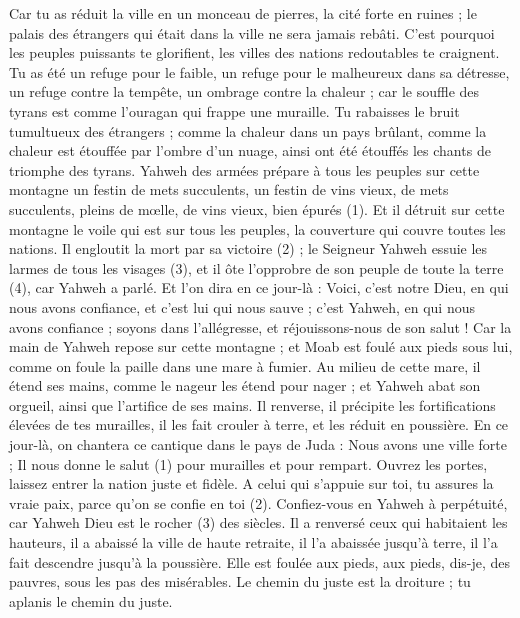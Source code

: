 \begin{multicols}{2}
Car tu as réduit la ville en un monceau de pierres, la cité forte en ruines ; le palais des étrangers qui était dans la ville ne sera jamais rebâti.
C’est pourquoi les peuples puissants te glorifient, les villes des nations redoutables te craignent.
Tu as été un refuge pour le faible, un refuge pour le malheureux dans sa détresse, un refuge contre la tempête, un ombrage contre la chaleur ; car le souffle des tyrans est comme l’ouragan qui frappe une muraille.
Tu rabaisses le bruit tumultueux des étrangers ; comme la chaleur dans un pays brûlant, comme la chaleur est étouffée par l'ombre d’un nuage, ainsi ont été étouffés les chants de triomphe des tyrans.
Yahweh des armées prépare à tous les peuples sur cette montagne un festin de mets succulents, un festin de vins vieux, de mets succulents, pleins de mœlle, de vins vieux, bien épurés (1).
Et il détruit sur cette montagne le voile qui est sur tous les peuples, la couverture qui couvre toutes les nations.
Il engloutit la mort par sa victoire (2) ; le Seigneur Yahweh essuie les larmes de tous les visages (3), et il ôte l'opprobre de son peuple de toute la terre (4), car Yahweh a parlé.
Et l'on dira en ce jour-là : Voici, c'est notre Dieu, en qui nous avons confiance, et c’est lui qui nous sauve ; c'est Yahweh, en qui nous avons confiance ; soyons dans l’allégresse, et réjouissons-nous de son salut !
Car la main de Yahweh repose sur cette montagne ; et Moab est foulé aux pieds sous lui, comme on foule la paille dans une mare à fumier.
Au milieu de cette mare, il étend ses mains, comme le nageur les étend pour nager ; et Yahweh abat son orgueil, ainsi que l’artifice de ses mains.
Il renverse, il précipite les fortifications élevées de tes murailles, il les fait crouler à terre, et les réduit en poussière.
\VerseOne{}En ce jour-là, on chantera ce cantique dans le pays de Juda : Nous avons une ville forte ; Il nous donne le salut (1) pour murailles et pour rempart.
Ouvrez les portes, laissez entrer la nation juste et fidèle.
A celui qui s’appuie sur toi, tu assures la vraie paix, parce qu’on se confie en toi (2).
Confiez-vous en Yahweh à perpétuité, car Yahweh Dieu est le rocher (3) des siècles.
Il a renversé ceux qui habitaient les hauteurs, il a abaissé la ville de haute retraite, il l’a abaissée jusqu'à terre, il l’a fait descendre jusqu'à la poussière.
Elle est foulée aux pieds, aux pieds, dis-je, des pauvres, sous les pas des misérables.
Le chemin du juste est la droiture ; tu aplanis le chemin du juste.

\end{multicols}

